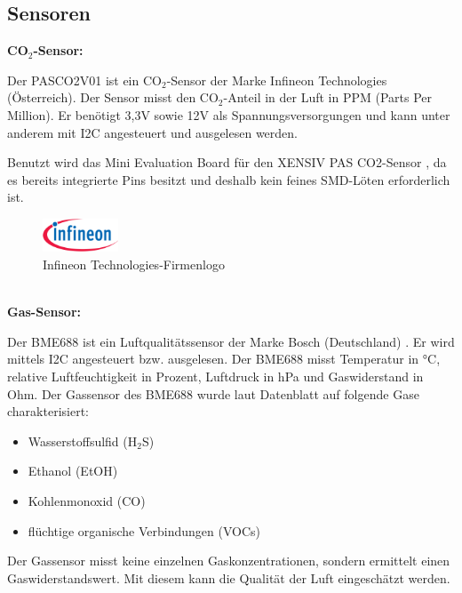 \begin{inhalt}
\subsection{Sensoren} \label{sec:Sensoren-design}

\textbf{CO$_2$-Sensor:}

\smallskip

Der PASCO2V01 ist ein CO$_2$-Sensor der Marke Infineon Technologies (Österreich). Der Sensor misst den CO$_2$-Anteil in der Luft in PPM (Parts Per Million). Er benötigt 3,3V sowie 12V als Spannungsversorgungen und kann unter anderem mit I2C angesteuert und ausgelesen werden. \cite{PASCO2V01}

Benutzt wird das Mini Evaluation Board für den XENSIV PAS CO2-Sensor \cite{PASCO2_Miniboard}, da es bereits integrierte Pins besitzt und deshalb kein feines SMD-Löten erforderlich ist. 

\begin{figure}[!htb]
\centering
\includegraphics[width=0.2\textwidth]{files/Tobias/pics/Logos/Infineon-Logo.svg.png}
\caption{Infineon Technologies-Firmenlogo \cite{Infineon Logo}}
\label{fig:Infineon Technologies-Firmenlogo}
\end{figure}

\bigskip \\

\textbf{Gas-Sensor:}

\smallskip

Der BME688 ist ein Luftqualitätssensor der Marke Bosch (Deutschland) \cite{BME688}. Er wird mittels I2C angesteuert bzw. ausgelesen. Der BME688 misst Temperatur in °C, relative Luftfeuchtigkeit in Prozent, Luftdruck in hPa und Gaswiderstand in Ohm. Der Gassensor des BME688 wurde laut Datenblatt auf folgende Gase charakterisiert:

\begin{itemize}
    \item Wasserstoffsulfid (H$_2$S) 
    \item Ethanol (EtOH) 
    \item Kohlenmonoxid (CO)
    \item flüchtige organische Verbindungen (VOCs)
\end{itemize}

Der Gassensor misst keine einzelnen Gaskonzentrationen, sondern ermittelt einen Gaswiderstandswert. Mit diesem kann die Qualität der Luft eingeschätzt werden. \cite{BME688}
\smallskip


\end{inhalt}
